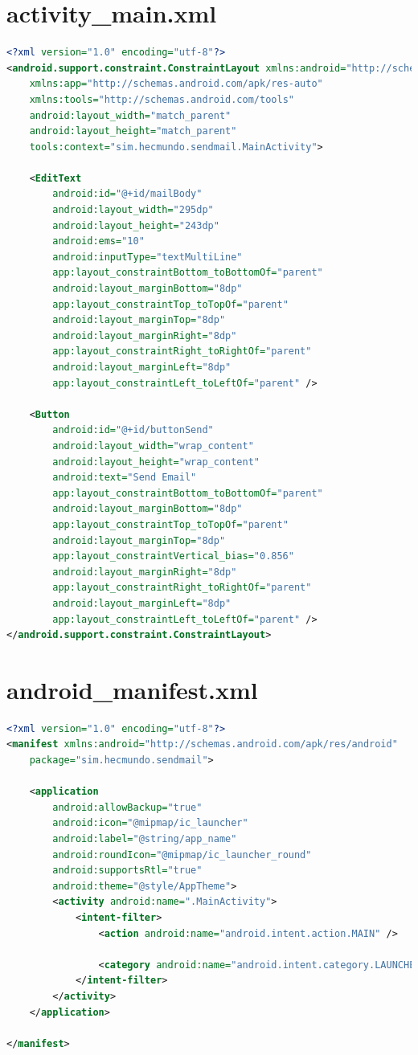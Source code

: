 \documentclass{report}
\begin{document}
\section{activity\_main.xml}
\begin{lstlisting}[language=xml]
<?xml version="1.0" encoding="utf-8"?>
<android.support.constraint.ConstraintLayout xmlns:android="http://schemas.android.com/apk/res/android"
    xmlns:app="http://schemas.android.com/apk/res-auto"
    xmlns:tools="http://schemas.android.com/tools"
    android:layout_width="match_parent"
    android:layout_height="match_parent"
    tools:context="sim.hecmundo.sendmail.MainActivity">

    <EditText
        android:id="@+id/mailBody"
        android:layout_width="295dp"
        android:layout_height="243dp"
        android:ems="10"
        android:inputType="textMultiLine"
        app:layout_constraintBottom_toBottomOf="parent"
        android:layout_marginBottom="8dp"
        app:layout_constraintTop_toTopOf="parent"
        android:layout_marginTop="8dp"
        android:layout_marginRight="8dp"
        app:layout_constraintRight_toRightOf="parent"
        android:layout_marginLeft="8dp"
        app:layout_constraintLeft_toLeftOf="parent" />

    <Button
        android:id="@+id/buttonSend"
        android:layout_width="wrap_content"
        android:layout_height="wrap_content"
        android:text="Send Email"
        app:layout_constraintBottom_toBottomOf="parent"
        android:layout_marginBottom="8dp"
        app:layout_constraintTop_toTopOf="parent"
        android:layout_marginTop="8dp"
        app:layout_constraintVertical_bias="0.856"
        android:layout_marginRight="8dp"
        app:layout_constraintRight_toRightOf="parent"
        android:layout_marginLeft="8dp"
        app:layout_constraintLeft_toLeftOf="parent" />
</android.support.constraint.ConstraintLayout>
\end{lstlisting}

\section{android\_manifest.xml}
\begin{lstlisting}[language=xml]
<?xml version="1.0" encoding="utf-8"?>
<manifest xmlns:android="http://schemas.android.com/apk/res/android"
    package="sim.hecmundo.sendmail">

    <application
        android:allowBackup="true"
        android:icon="@mipmap/ic_launcher"
        android:label="@string/app_name"
        android:roundIcon="@mipmap/ic_launcher_round"
        android:supportsRtl="true"
        android:theme="@style/AppTheme">
        <activity android:name=".MainActivity">
            <intent-filter>
                <action android:name="android.intent.action.MAIN" />

                <category android:name="android.intent.category.LAUNCHER" />
            </intent-filter>
        </activity>
    </application>

</manifest>
\end{lstlisting}
\end{document}
